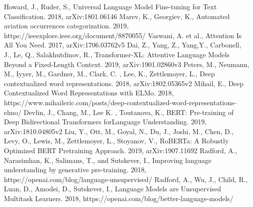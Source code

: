 \documentclass[12pt,german]{report}
\begin{document}

\newpage 
\thispagestyle{empty}
\quad 
\newpage

\tableofcontents
\newpage 
\thispagestyle{empty}
\quad 
\newpage


\newpage 
\thispagestyle{empty}
\quad 
\newpage


\begin{onehalfspace}




\end{onehalfspace}

\listoffigures

\begin{thebibliography}{}
 Howard, J., Ruder, S., Universal Language Model Fine-tuning for Text Classification. 2018,  arXiv:1801.06146 
 Marev, K., Georgiev, K., Automated aviation occurrences categorization. 2019, https://ieeexplore.ieee.org/document/8870055/
 Vaswani, A. et al., Attention Is All You Need. 2017,  arXiv:1706.03762v5 
 Dai, Z., Yang, Z., Yang,Y., Carbonell, J., Le, Q., Salakhutdinov, R., Transformer-XL: Attentive Language Models
Beyond a Fixed-Length Context. 2019,  arXiv:1901.02860v3 
 Peters, M.,  Neumann, M.,  Iyyer, M., Gardner, M.,  Clark, C. , Lee, K., Zettlemoyer, L.,  Deep contextualized word representations. 2018, arXiv:1802.05365v2
 Mihail, E., Deep Contextualized Word Representations with ELMo. 2018, https://www.mihaileric.com/posts/deep-contextualized-word-representations-elmo/
 Devlin, J., Chang, M., Lee K. , Toutanova, K., BERT: Pre-training of Deep Bidirectional Transformers forLanguage Understanding. 2019, arXiv:1810.04805v2
 Liu, Y., Ott, M., Goyal, N., Du, J., Joshi, M., Chen, D., Levy, O., Lewis, M., Zettlemoyer, L., Stoyanov, V., RoBERTa: A Robustly Optimized BERT Pretraining Approach. 2019, arXiv:1907.11692
 Radford,  A.,  Narasimhan,  K.,  Salimans,  T.,  and  Sutskever,  I., Improving language understanding by generative pre-training. 2018, https://openai.com/blog/language-unsupervised/
 Radford, A., Wu, J., Child, R., Luan, D., Amodei, D., Sutskever, I., Language Models are Unsupervised Multitask Learners. 2018, https://openai.com/blog/better-language-models/

\end{thebibliography}
\end{document}
